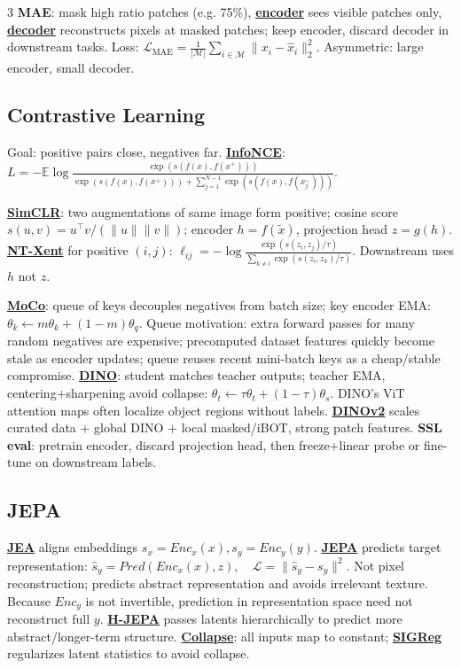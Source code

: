 \documentclass{article}
\numberwithin{equation}{subsection}
\newcommand{\key}[1]{\textbf{#1}}
\newcommand{\lowterm}[1]{\textbf{\underline{#1}}}
\newcommand{\E}{\mathbb{E}}
\begin{document}
\begin{multicols*}{3}
\key{MAE}: mask high ratio patches (e.g. 75\%), \lowterm{encoder} sees visible patches only, \lowterm{decoder} reconstructs pixels at masked patches; keep encoder, discard decoder in downstream tasks. Loss:
\(
\mathcal L_{\mathrm{MAE}}=\frac1{|\mathcal M|}\sum_{i\in\mathcal M}\|x_i-\hat x_i\|_2^2.
\)
Asymmetric: large encoder, small decoder.

\subsection{Contrastive Learning}
Goal: positive pairs close, negatives far. \lowterm{InfoNCE}:
\(
L=-\E\log\frac{\exp(s(f(x),f(x^+)))}{\exp(s(f(x),f(x^+)))+\sum_{j=1}^{N-1}\exp(s(f(x),f(x_j^-)))}.
\)

\lowterm{SimCLR}: two augmentations of same image form positive; cosine score $s(u,v)=u^\top v/(\|u\|\|v\|)$; encoder $h=f(\tilde x)$, projection head $z=g(h)$. \lowterm{NT-Xent} for positive $(i,j)$:
\(
\ell_{ij}=-\log\frac{\exp(s(z_i,z_j)/\tau)}{\sum_{k\ne i}\exp(s(z_i,z_k)/\tau)}.
\)
Downstream uses $h$ not $z$. 

\lowterm{MoCo}: queue of keys decouples negatives from batch size; key encoder EMA:
\(
\theta_k\leftarrow m\theta_k+(1-m)\theta_q.
\)
Queue motivation: extra forward passes for many random negatives are expensive; precomputed dataset features quickly become stale as encoder updates; queue reuses recent mini-batch keys as a cheap/stable compromise.
\lowterm{DINO}: student matches teacher outputs; teacher EMA, centering+sharpening avoid collapse:
\(
\theta_t\leftarrow \tau\theta_t+(1-\tau)\theta_s.
\)
DINO's ViT attention maps often localize object regions without labels. \lowterm{DINOv2} scales curated data + global DINO + local masked/iBOT, strong patch features. \key{SSL eval}: pretrain encoder, discard projection head, then freeze+linear probe or fine-tune on downstream labels.

\subsection{JEPA}
\lowterm{JEA} aligns embeddings $s_x=Enc_x(x),s_y=Enc_y(y)$. \lowterm{JEPA} predicts target representation:
\(
\hat s_y=Pred(Enc_x(x),z),\quad \mathcal L=\|\hat s_y-s_y\|^2.
\)
Not pixel reconstruction; predicts abstract representation and avoids irrelevant texture. Because $Enc_y$ is not invertible, prediction in representation space need not reconstruct full $y$. \lowterm{H-JEPA} passes latents hierarchically to predict more abstract/longer-term structure. \lowterm{Collapse}: all inputs map to constant; \lowterm{SIGReg} regularizes latent statistics to avoid collapse.


\end{multicols*}
\end{document}

